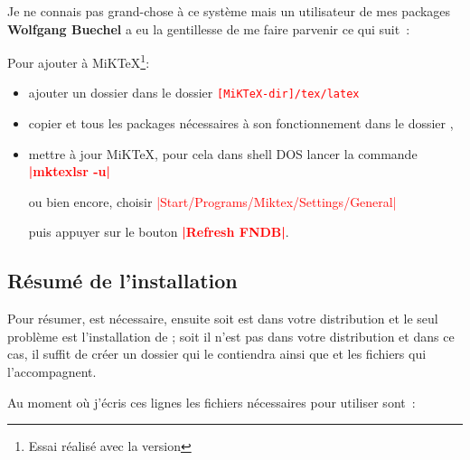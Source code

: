 Je ne connais pas grand-chose à ce système mais un utilisateur de mes packages \textbf{Wolfgang Buechel} a eu la gentillesse de me faire parvenir ce qui suit~:

Pour ajouter  à MiKTeX\footnote{Essai réalisé avec la version }:

\begin{itemize}\setlength{\itemsep}{10pt}
  \item ajouter un dossier  dans le dossier
       \textcolor{red}{\texttt{[MiKTeX-dir]/tex/latex}}
  \item copier  et tous les packages nécessaires à son fonctionnement  dans le dossier ,
  \item mettre à jour  MiKTeX, pour cela dans shell DOS lancer la commande   \textbf{\textcolor{red}{|mktexlsr -u|}} 
  
   ou bien encore, choisir \textcolor{red}{|Start/Programs/Miktex/Settings/General|}
   
    puis appuyer sur le bouton  \textbf{\textcolor{red}{|Refresh FNDB|}}.
\end{itemize}

\subsection{Résumé de l'installation}

Pour résumer,   est nécessaire,  ensuite soit  est dans votre distribution et le seul problème est l'installation de ; soit il n'est pas dans votre distribution et dans ce cas, il suffit de créer un dossier qui le contiendra ainsi que  et les fichiers qui l'accompagnent.

Au moment où j'écris ces lignes les fichiers nécessaires pour utiliser  sont~:  

